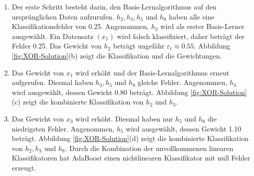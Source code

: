 \begin{enumerate}
    \item Der erste Schritt besteht darin, den Basis-Lernalgorithmus auf den ursprünglichen Daten aufzurufen.
          $h_2, h_3, h_5$ und $h_8$ haben alle eine Klassifikationsfehler von 0.25. Angenommen, $h_2$ wird als erster
          Basis-Lerner ausgewählt. Ein Datensatz $(x_1)$ wird falsch klassifiziert, daher beträgt der Fehler 0.25.
          Das Gewicht von $h_2$ beträgt ungefähr $\varepsilon_t\approx 0.55$. Abbildung \ref*{fig:XOR-Solution}(b) zeigt die Klassifikation und die Gewichtungen.
    \item Das Gewicht von $x_1$ wird erhöht und der Basis-Lernalgorithmus erneut aufgerufen. Diesmal haben $h_3, h_5$ und $h_8$
          gleiche Fehler. Angenommen, $h_3$ wird ausgewählt, dessen Gewicht 0.80 beträgt. Abbildung \ref*{fig:XOR-Solution}(c)
          zeigt die kombinierte Klassifikation von $h_2$ und $h_3$.
    \item Das Gewicht von $x_3$ wird erhöht. Diesmal haben nur $h_5$ und $h_8$ die niedrigsten Fehler. Angenommen, $h_5$ wird
          ausgewählt, dessen Gewicht 1.10 beträgt. Abbildung \ref*{fig:XOR-Solution}(d) zeigt die kombinierte Klassifikation
          von $h_2, h_3$ und $h_8$. Durch die Kombination der unvollkommenen linearen Klassifikatoren hat AdaBoost einen nichtlinearen Klassifikator mit
          null Fehler erzeugt.
\end{enumerate}